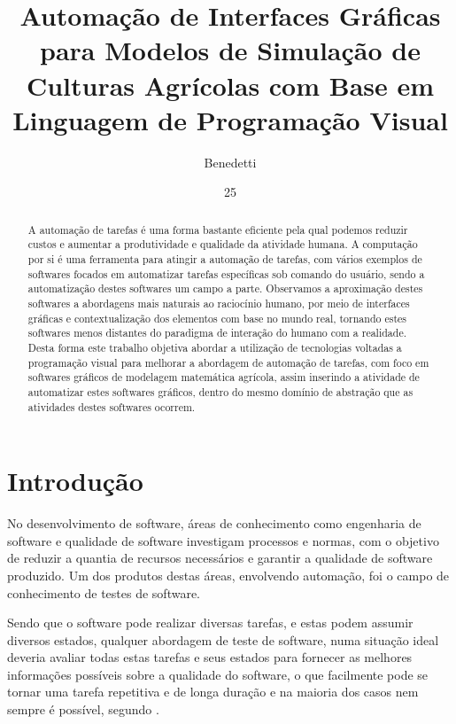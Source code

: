 \documentclass[tg]{mdtufsm}
\title{Automação de Interfaces Gráficas para Modelos de Simulação de Culturas Agrícolas com Base em Linguagem de Programação Visual}
\author{Benedetti}{Romulo Pulcinelli}
\institute{Centro de Tecnologia}
\date{25}{Maio}{2016}
\begin{document}
\maketitle
\makeapprove

\begin{abstract}
	A automação de tarefas é uma forma bastante eficiente pela qual podemos reduzir custos e aumentar a produtividade e qualidade da atividade humana. A computação por si é uma ferramenta para atingir a automação de tarefas, com vários exemplos de softwares focados em automatizar tarefas específicas sob comando do usuário, sendo a automatização destes softwares um campo a parte. Observamos a aproximação destes softwares a abordagens mais naturais ao raciocínio humano, por meio de interfaces gráficas e contextualização dos elementos com base no mundo real, tornando estes softwares menos distantes do paradigma de interação do humano com a realidade. Desta forma este trabalho objetiva abordar a utilização de tecnologias voltadas a programação visual para melhorar a abordagem de automação de tarefas, com foco em softwares gráficos de modelagem matemática agrícola, assim inserindo a atividade de automatizar estes softwares gráficos, dentro do mesmo domínio de abstração que as atividades destes softwares ocorrem.
\end{abstract}

\tableofcontents

\setlength{\baselineskip}{1.5\baselineskip}

\chapter{Introdução}

	No desenvolvimento de software, áreas de conhecimento como engenharia de software e qualidade de software
investigam processos e normas, com o objetivo de reduzir a quantia de recursos necessários e garantir a qualidade de
software produzido. Um dos produtos destas áreas, envolvendo automação, foi o campo de conhecimento de testes de software.

Sendo que o software pode realizar diversas tarefas, e estas podem assumir diversos estados, qualquer abordagem
de teste de software, numa situação ideal deveria avaliar todas estas tarefas e seus estados para fornecer as melhores
informações possíveis sobre a qualidade do software, o que facilmente pode se tornar uma tarefa repetitiva e de longa
duração e na maioria dos casos nem sempre é possível, segundo \cite[pag. 10]{myers2011art}.
\end{document}
